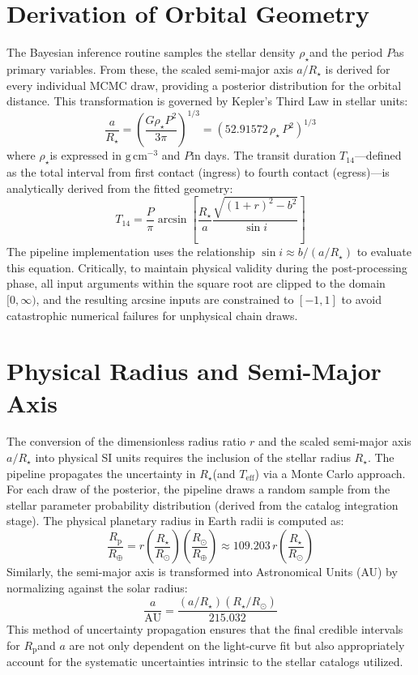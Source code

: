 \documentclass[12pt,a4paper,oneside]{report}
\newcommand{\Rsun}{\ensuremath{R_{\odot}}}
\newcommand{\Rearth}{\ensuremath{R_{\oplus}}}
\newcommand{\Rstar}{\ensuremath{R_{\star}}}
\newcommand{\Teff}{\ensuremath{T_{\mathrm{eff}}}}
\newcommand{\rhoStar}{\ensuremath{\rho_{\star}}}
\newcommand{\Rp}{\ensuremath{R_{\mathrm{p}}}}
\newcommand{\Porb}{\ensuremath{P}}
\newcommand{\Tfourteen}{\ensuremath{T_{14}}}
\begin{document}
\section{Derivation of Orbital Geometry}
The Bayesian inference routine samples the stellar density \rhoStar and the period \Porb as primary variables. From these, the scaled semi-major axis $a/\Rstar$ is derived for every individual MCMC draw, providing a posterior distribution for the orbital distance. This transformation is governed by Kepler's Third Law in stellar units:
\begin{equation}
  \frac{a}{\Rstar} = \left( \frac{G \rhoStar \Porb^2}{3\pi} \right)^{1/3} = \left( 52.91572\,\rhoStar\,\Porb^2 \right)^{1/3}
\end{equation}
where \rhoStar is expressed in \(\mathrm{g\,cm^{-3}}\) and \Porb in days. The transit duration $T_{14}$—defined as the total interval from first contact (ingress) to fourth contact (egress)—is analytically derived from the fitted geometry:
\begin{equation}
  \Tfourteen = \frac{\Porb}{\pi} \arcsin\left[ \frac{\Rstar}{a} \frac{\sqrt{(1 + r)^2 - b^2}}{\sin i} \right]
\end{equation}
The pipeline implementation uses the relationship $\sin i \approx b / (a/\Rstar)$ to evaluate this equation. Critically, to maintain physical validity during the post-processing phase, all input arguments within the square root are clipped to the domain $[0, \infty)$, and the resulting arcsine inputs are constrained to $[-1, 1]$ to avoid catastrophic numerical failures for unphysical chain draws.

\section{Physical Radius and Semi-Major Axis}
The conversion of the dimensionless radius ratio $r$ and the scaled semi-major axis $a/\Rstar$ into physical SI units requires the inclusion of the stellar radius \Rstar. The pipeline propagates the uncertainty in \Rstar (and \Teff) via a Monte Carlo approach. For each draw of the posterior, the pipeline draws a random sample from the stellar parameter probability distribution (derived from the catalog integration stage). The physical planetary radius in Earth radii is computed as:
\begin{equation}
  \frac{\Rp}{\Rearth} = r \left( \frac{\Rstar}{\Rsun} \right) \left( \frac{\Rsun}{\Rearth} \right) \approx 109.203 \, r \left( \frac{\Rstar}{\Rsun} \right)
\end{equation}
Similarly, the semi-major axis is transformed into Astronomical Units (AU) by normalizing against the solar radius:
\begin{equation}
  \frac{a}{\mathrm{AU}} = \frac{(a/\Rstar) (\Rstar/\Rsun)}{215.032}
\end{equation}
This method of uncertainty propagation ensures that the final credible intervals for \Rp and $a$ are not only dependent on the light-curve fit but also appropriately account for the systematic uncertainties intrinsic to the stellar catalogs utilized.
\end{document}
